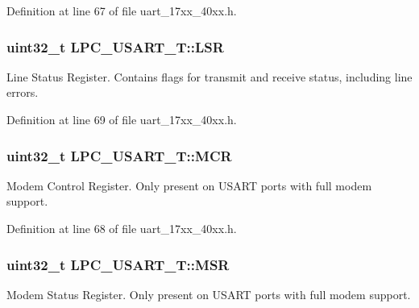 Definition at line 67 of file uart\+\_\+17xx\+\_\+40xx.\+h.

\subsubsection[{\texorpdfstring{L\+SR}{LSR}}]{ uint32\+\_\+t L\+P\+C\+\_\+\+U\+S\+A\+R\+T\+\_\+\+T\+::\+L\+SR}\hypertarget{structLPC__USART__T_a71f711aab2dc24f42d183abd449ce829}{}\label{structLPC__USART__T_a71f711aab2dc24f42d183abd449ce829}
Line Status Register. Contains flags for transmit and receive status, including line errors. 

Definition at line 69 of file uart\+\_\+17xx\+\_\+40xx.\+h.

\subsubsection[{\texorpdfstring{M\+CR}{MCR}}]{ uint32\+\_\+t L\+P\+C\+\_\+\+U\+S\+A\+R\+T\+\_\+\+T\+::\+M\+CR}\hypertarget{structLPC__USART__T_a3fca7faf2cc9ec38e5a8566538cadf48}{}\label{structLPC__USART__T_a3fca7faf2cc9ec38e5a8566538cadf48}
Modem Control Register. Only present on U\+S\+A\+RT ports with full modem support. 

Definition at line 68 of file uart\+\_\+17xx\+\_\+40xx.\+h.

\subsubsection[{\texorpdfstring{M\+SR}{MSR}}]{ uint32\+\_\+t L\+P\+C\+\_\+\+U\+S\+A\+R\+T\+\_\+\+T\+::\+M\+SR}\hypertarget{structLPC__USART__T_ac4372e0a659dc1f4b5503a8825ed1971}{}\label{structLPC__USART__T_ac4372e0a659dc1f4b5503a8825ed1971}
Modem Status Register. Only present on U\+S\+A\+RT ports with full modem support. 

